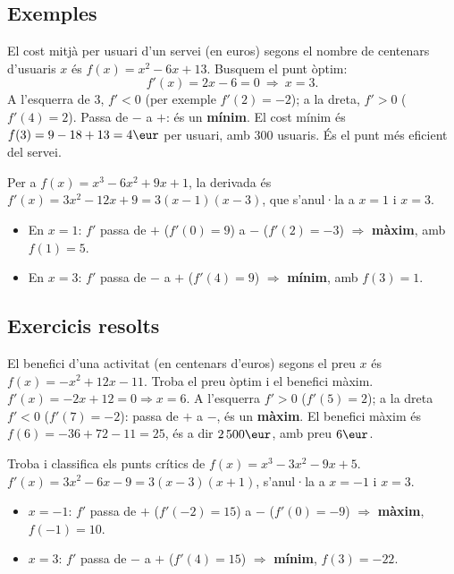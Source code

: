 \subsection{Exemples}

\begin{exemple}
El cost mitjà per usuari d'un servei (en euros) segons el nombre de centenars d'usuaris
$x$ és $f(x)=x^2-6x+13$. Busquem el punt òptim:
\[
f'(x)=2x-6=0 \ \Rightarrow\ x=3.
\]
A l'esquerra de $3$, $f'<0$ (per exemple $f'(2)=-2$); a la dreta, $f'>0$ ($f'(4)=2$).
Passa de $-$ a $+$: és un \textbf{mínim}. El cost mínim és $f(3)=9-18+13=4\eur$ per
usuari, amb $300$ usuaris. És el punt més eficient del servei.
\end{exemple}

\begin{exemple}
Per a $f(x)=x^3-6x^2+9x+1$, la derivada és $f'(x)=3x^2-12x+9=3(x-1)(x-3)$, que
s'anul·la a $x=1$ i $x=3$.
\begin{itemize}[leftmargin=1.4em, itemsep=2pt]
  \item En $x=1$: $f'$ passa de $+$ ($f'(0)=9$) a $-$ ($f'(2)=-3$) $\Rightarrow$
        \textbf{màxim}, amb $f(1)=5$.
  \item En $x=3$: $f'$ passa de $-$ a $+$ ($f'(4)=9$) $\Rightarrow$ \textbf{mínim}, amb
        $f(3)=1$.
\end{itemize}
\end{exemple}

\subsection{Exercicis resolts}

\begin{exresolt}
El benefici d'una activitat (en centenars d'euros) segons el preu $x$ és
$f(x)=-x^2+12x-11$. Troba el preu òptim i el benefici màxim.
\solucio
$f'(x)=-2x+12=0 \Rightarrow x=6$. A l'esquerra $f'>0$ ($f'(5)=2$); a la dreta $f'<0$
($f'(7)=-2$): passa de $+$ a $-$, és un \textbf{màxim}. El benefici màxim és
$f(6)=-36+72-11=25$, és a dir $2\,500\eur$, amb preu $6\eur$.
\end{exresolt}

\begin{exresolt}
Troba i classifica els punts crítics de $f(x)=x^3-3x^2-9x+5$.
\solucio
$f'(x)=3x^2-6x-9=3(x-3)(x+1)$, s'anul·la a $x=-1$ i $x=3$.
\begin{itemize}[leftmargin=1.4em, itemsep=2pt]
  \item $x=-1$: $f'$ passa de $+$ ($f'(-2)=15$) a $-$ ($f'(0)=-9$) $\Rightarrow$
        \textbf{màxim}, $f(-1)=10$.
  \item $x=3$: $f'$ passa de $-$ a $+$ ($f'(4)=15$) $\Rightarrow$ \textbf{mínim},
        $f(3)=-22$.
\end{itemize}
\end{exresolt}

